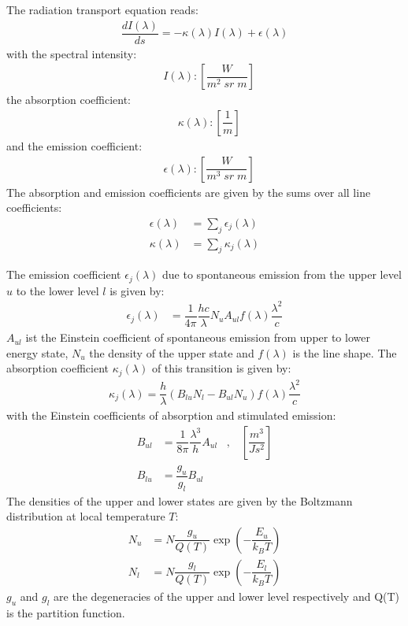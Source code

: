 The radiation transport equation reads:
\begin{align}
	\label{eqn1}
	\dfrac{d I(\lambda)}{ds} = - \kappa(\lambda) I(\lambda) + \epsilon(\lambda)
\end{align}
with the spectral intensity:
\begin{align*}
	&I(\lambda)    : \left[\dfrac{W}{m^2 \; sr \; m}\right]
\end{align*}
the absorption coefficient:
\begin{align*}
	&\kappa(\lambda)   : \left[\dfrac{1}{m}\right]
\end{align*}
and the emission coefficient:
\begin{align*}
	&\epsilon(\lambda) : \left[\dfrac{W}{m^3 \; sr \; m}\right]
\end{align*}
The absorption and emission coefficients are given by the sums over all 
line coefficients:
\begin{align*}
	\epsilon(\lambda) &= \sum_j \epsilon_j(\lambda) \\
	\kappa(\lambda) &= \sum_j \kappa_j(\lambda)
\end{align*}

The emission coefficient $\epsilon_j(\lambda)$ due to spontaneous emission from the upper level $u$ to the lower level $l$ is given by:
\begin{align}
	\epsilon_j(\lambda) &= \dfrac{1}{4 \pi} \dfrac{h c}{\lambda} N_u A_{ul} f(\lambda)
	 \dfrac{\lambda^2}{c}
\end{align}
$A_{ul}$ ist the Einstein coefficient of spontaneous emission from upper to lower energy state, $N_u$ the density of the upper state and $f(\lambda)$ is the line shape. The absorption coefficient $\kappa_j(\lambda)$ of this transition is given by:
\begin{align}
	\kappa_j(\lambda)  = \dfrac{h}{\lambda}  \left(  B_{lu} N_l -  B_{ul} N_u \right) f(\lambda)
	 \dfrac{\lambda^2}{c}
\end{align}
with the Einstein coefficients of absorption and stimulated emission:
\begin{align}
	B_{ul} &= \dfrac{1}{8 \pi} \dfrac{\lambda^3}{h} A_{ul} \;\;\; , \;\;\; \left[\dfrac{m^3}{J s^2}\right] \\
	B_{lu} &= \dfrac{g_u}{g_l} B_{ul}
\end{align}
The densities of the upper and lower states are given by the Boltzmann distribution at local temperature $T$:
\begin{align}
	N_u &= N \dfrac{g_u}{Q(T)} \exp\left(- \dfrac{E_u}{k_B T} \right) \\
	N_l &= N \dfrac{g_l}{Q(T)} \exp\left(- \dfrac{E_l}{k_B T} \right)
\end{align}
$g_u$ and $g_l$ are the degeneracies of the upper and lower level respectively and Q(T) is the partition function.


